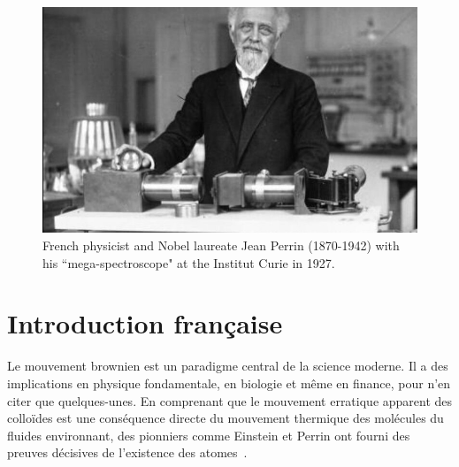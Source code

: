 \begin{figure}[h]
	\begin{center}
		\includegraphics[width=16cm]{02_body/introduction/image/perrin.jpg}
		\caption{French physicist and Nobel laureate Jean Perrin (1870-1942) with his ``mega-spectroscope" at the Institut Curie in 1927.}
	\end{center}
\end{figure}


\section{Introduction française}


Le mouvement brownien est un paradigme central de la science moderne. Il a des implications en physique fondamentale, en biologie et même en finance, pour n'en citer que quelques-unes. En comprenant que le mouvement erratique apparent des colloïdes est une conséquence directe du mouvement thermique des molécules du fluides environnant, des pionniers comme Einstein et Perrin ont fourni des preuves décisives de l'existence des atomes~\cite{einstein_uber_1905,perrin_les_2014}.

